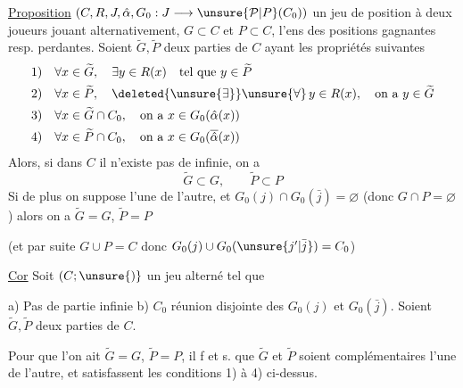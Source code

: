 \uline{Proposition}  $(C,R,J,\hat\alpha,G_0:J\longrightarrow\unsure{\mathcal P|P}(C_0))$ un jeu de position à deux joueurs jouant alternativement, $G\subset C$ et $P\subset C$, l'ens des positions gagnantes resp. perdantes. Soient $\widetilde G,\widetilde P$ deux parties de $C$ ayant les propriétés suivantes
\[
\begin{aligned}
1)\quad&\forall x\in\widetilde G,\quad\exists y\in R(x)\quad\text{tel que }y\in\widetilde P\\
2)\quad&\forall x\in\widetilde P,\quad\deleted{\unsure{\exists}}\unsure{\forall}\,y\in R(x),\quad\text{on a }y\in\widetilde G\\
3)\quad&\forall x\in\widetilde G\cap C_0,\quad\text{on a }x\in G_0(\hat\alpha(x))\\
4)\quad&\forall x\in\widetilde P\cap C_0,\quad\text{on a }x\in G_0(\overline{\hat\alpha}(x))
\end{aligned}
\]
Alors, si dans $C$ il n'existe pas de   infinie, on a
\[
\widetilde G\subset G,\qquad\widetilde P\subset P
\]
Si de plus on suppose   l'une de l'autre,  et $G_0(j)\cap G_0(\bar j)=\varnothing$ (donc $G\cap P=\varnothing$) alors on a $\widetilde G=G$, $\widetilde P=P$

(et par suite $G\cup P=C$ donc $G_0(j)\cup G_0(\unsure{j'|\bar j})=C_0$)

\uline{Cor} Soit $(C;\unsure{)}$ un jeu alterné tel que 

a) Pas de partie infinie \quad b) $C_0$ réunion disjointe des $G_0(j)$ et $G_0(\bar j)$. Soient $\widetilde G,\widetilde P$ deux parties de $C$.

Pour que l'on ait $\widetilde G=G$, $\widetilde P=P$, il f et s. que $\widetilde G$ et $\widetilde P$ soient complémentaires l'une de l'autre, et satisfassent les conditions 1) à 4) ci-dessus.
